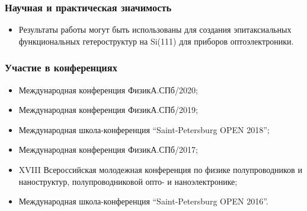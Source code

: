 \begin{frame}
    \frametitle{Научная и практическая значимость}
    \begin{itemize}
		\item Результаты работы могут быть использованы для создания эпитаксиальных функциональных гетероструктур на Si(111) для приборов оптоэлектроники.
    \end{itemize}
\end{frame}
%
%

\begin{frame}
	\frametitle{Участие в конференциях}
	\begin{itemize}
		\item Международная конференция ФизикА.СПб/2020;
		\item Международная конференция ФизикА.СПб/2019;
		\item Международная школа-конференция “Saint-Petersburg OPEN 2018”;
		\item Международная конференция ФизикА.СПб/2017;
		\item XVIII Всероссийская молодежная конференция по физике полупроводников и наноструктур, полупроводниковой опто- и наноэлектронике;
		\item Международная школа-конференция “Saint-Petersburg OPEN 2016”.
	\end{itemize}
\end{frame}

